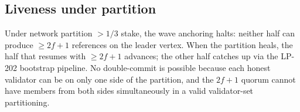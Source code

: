 \subsection{Liveness under partition}

Under network partition $> 1/3$ stake, the wave anchoring halts:
neither half can produce $\geq 2f{+}1$ references on the leader
vertex. When the partition heals, the half that resumes with
$\geq 2f{+}1$ advances; the other half catches up via the LP-202
bootstrap pipeline. No double-commit is possible because each
honest validator can be on only one side of the partition, and the
$2f{+}1$ quorum cannot have members from both sides simultaneously
in a valid validator-set partitioning.

